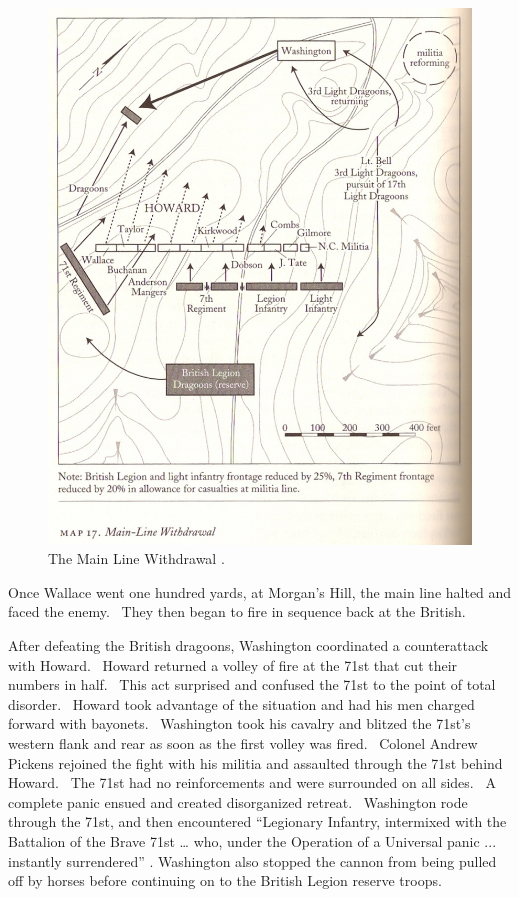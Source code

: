 \begin{figure}[ht]
    \begin{center}
    \includegraphics[width=\textwidth]{gfx/beiber07}
    \end{center}
    \caption{The Main Line Withdrawal \cite[116]{babits_devil_2001}.}
    \label{beiber07}
\end{figure}



Once Wallace went one hundred yards, at Morgan’s Hill, the main line halted and
faced the enemy.  They then began to fire in sequence back at the British.  

After defeating the British dragoons, Washington coordinated a counterattack
with Howard.  Howard returned a volley of fire at the 71st that cut their
numbers in half.  This act surprised and confused the 71st to the point of total
disorder.  Howard took advantage of the situation and had his men charged
forward with bayonets.  Washington took his cavalry and blitzed the 71st’s
western flank and rear as soon as the first volley was fired.  Colonel Andrew
Pickens rejoined the fight with his militia and assaulted through the 71st
behind Howard.  The 71st had no reinforcements and were surrounded on all sides.
 A complete panic ensued and created disorganized retreat.  Washington rode
through the 71st, and then encountered “Legionary Infantry, intermixed with the
Battalion of the Brave 71st … who, under the Operation of a Universal panic ...
instantly surrendered” \cite[p.127]{babits_devil_2001}.  Washington also stopped the cannon from
being pulled off by horses before continuing on to the British Legion reserve
troops.    

